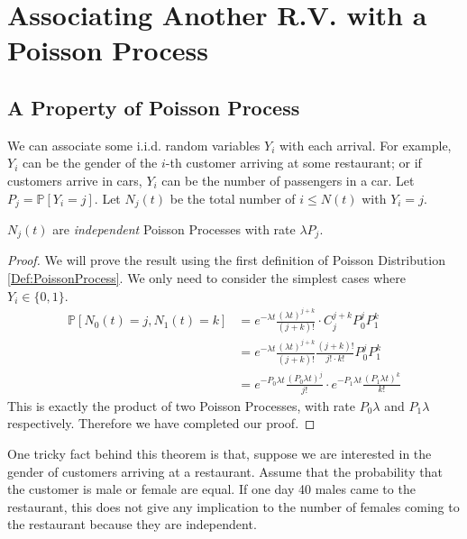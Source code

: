 \section{Associating Another R.V. with a Poisson Process}

    \subsection{A Property of Poisson Process}
        We can associate some i.i.d. random variables $Y_i$ with each arrival. For example, $Y_i$ can be the gender of the $i$-th customer arriving at some restaurant; or if customers arrive in cars, $Y_i$ can be the number of passengers in a car. Let $P_j = \mathbb{P}[Y_i = j]$. Let $N_j(t)$ be the total number of $i \le N(t)$ with $Y_i = j$.

        \begin{theorem}\label{Thm:ThinningOfPoissonProcess}
            $N_j(t)$ are \emph{independent} Poisson Processes with rate $\lambda P_j$.
        \end{theorem}
        \begin{proof}
            We will prove the result using the first definition of Poisson Distribution \ref{Def:PoissonProcess}. We only need to consider the simplest cases where $Y_i \in \{0,1\}$.
            \begin{align*}
                \mathbb{P}[N_0(t) = j, N_1(t) = k] &= e^{-\lambda t}\frac{(\lambda t)^{j+k}}{(j+k)!}\cdot C^{j+k}_j P_0^j P_1^k \\
                &= e^{-\lambda t}\frac{(\lambda t)^{j+k}}{(j+k)!}\frac{(j+k)!}{j! \cdot k!}P_0^j P_1^k\\
                &= e^{-P_0\lambda t}\frac{(P_0\lambda t)^j}{j!} \cdot e^{-P_1\lambda t} \frac{(P_1 \lambda t)^k}{k!}
            \end{align*}
            This is exactly the product of two Poisson Processes, with rate $P_0\lambda$ and $P_1\lambda$ respectively. Therefore we have completed our proof.
        \end{proof}
        \begin{remark}
            One tricky fact behind this theorem is that, suppose we are interested in the gender of customers arriving at a restaurant. Assume that the probability that the customer is male or female are equal. If one day 40 males came to the restaurant, this does not give any implication to the number of females coming to the restaurant because they are independent.
        \end{remark}

